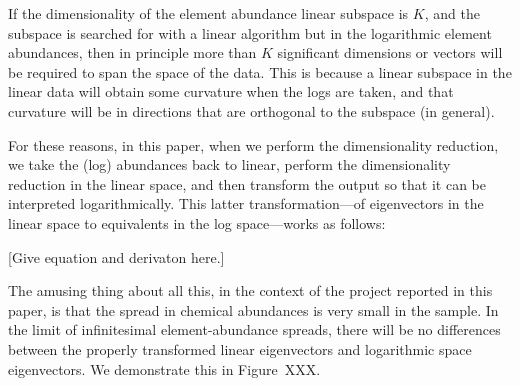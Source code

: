 \documentclass[letterpaper, modern]{aastex62}
\begin{document}
If the dimensionality of the element abundance linear subspace is $K$, and the
subspace is searched for with a linear algorithm but in the logarithmic element
abundances, then in principle more than $K$ significant dimensions or vectors
will be required to span the space of the data.
This is because a linear subspace in the linear data will obtain some curvature
when the logs are taken, and that curvature will be in directions that are orthogonal
to the subspace (in general).

For these reasons, in this paper, when we perform the dimensionality reduction,
we take the (log) abundances back to linear, perform the dimensionality reduction
in the linear space, and then transform the output so that it can be interpreted
logarithmically.
This latter transformation---of eigenvectors in the linear space to equivalents
in the log space---works as follows:

[Give equation and derivaton here.]

The amusing thing about all this, in the context of the project reported in this paper,
is that the spread in chemical abundances is very small in the sample.
In the limit of infinitesimal element-abundance spreads, there will be no differences
between the properly transformed linear eigenvectors and logarithmic space eigenvectors.
We demonstrate this in Figure~XXX.
\end{document}
